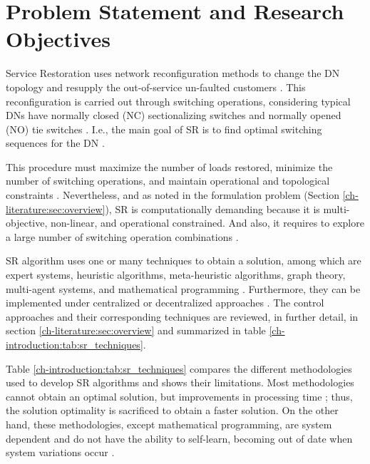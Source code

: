 \section{Problem Statement and Research Objectives}
\label{ch-introduction:sec:problem}

Service Restoration uses network reconfiguration methods to change the DN topology and resupply the out-of-service 
un-faulted customers \cite{Gholami2015}\cite{Shen2018}. This reconfiguration is carried out through 
switching operations, considering typical DNs have normally closed (NC) sectionalizing switches and normally 
opened (NO) tie switches \cite{Zidan2017} \cite{Sanches2014}. I.e., the main goal of SR is to find 
optimal switching sequences for the DN \cite{Latare2017}.

This procedure must maximize the number of loads restored, minimize the number of switching operations, and 
maintain operational and topological constraints \cite{Abu-Elanien2018} \cite{Gholami2015}. 
Nevertheless, and as noted in the formulation problem (Section \ref{ch-literature:sec:overview}), SR is computationally demanding because it is multi-objective, 
non-linear, and operational constrained. And also, it requires to explore a large number of switching operation 
combinations \cite{Shen2018} \cite{Sanches2014}. 

SR algorithm uses one or many techniques to obtain a solution, among which are expert systems, heuristic 
algorithms, meta-heuristic algorithms, graph theory, multi-agent systems, and mathematical programming \cite{Shen2018}. 
Furthermore, they can be implemented under centralized or decentralized approaches \cite{Zidan2017}. The control approaches 
and their corresponding techniques are reviewed, in further detail, in section \ref{ch-literature:sec:overview} and 
summarized in table \ref{ch-introduction:tab:sr_techniques}. 



Table \ref{ch-introduction:tab:sr_techniques} compares the different methodologies used to develop SR 
algorithms and shows their limitations. Most methodologies cannot obtain an optimal solution, 
but improvements in processing time \cite{Abu-Elanien2018}; thus, the solution optimality is sacrificed to obtain a faster solution. 
On the other hand, these methodologies, except mathematical programming, are system dependent and do not 
have the ability to self-learn, becoming out of date when system variations occur \cite{Zidan2017}.

